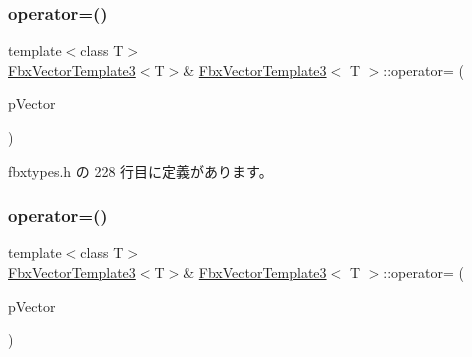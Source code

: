 \mbox{\label{class_fbx_vector_template3_a6776a6fce109a4e5eac1ef4efb56f070}} 
\subsubsection{\texorpdfstring{operator=()}{operator=()}\hspace{0.1cm}{\footnotesize\ttfamily [2/3]}}
{\footnotesize\ttfamily template$<$class T$>$ \\
\hyperlink{class_fbx_vector_template3}{Fbx\+Vector\+Template3}$<$T$>$\& \hyperlink{class_fbx_vector_template3}{Fbx\+Vector\+Template3}$<$ T $>$\+::operator= (\begin{DoxyParamCaption}\item[{const \hyperlink{class_fbx_vector_template2}{Fbx\+Vector\+Template2}$<$ T $>$ \&}]{p\+Vector }\end{DoxyParamCaption})\hspace{0.3cm}{\ttfamily [inline]}}



 fbxtypes.\+h の 228 行目に定義があります。

\mbox{\label{class_fbx_vector_template3_a19181aa6e706a12de98b417624e67e4d}} 
\subsubsection{\texorpdfstring{operator=()}{operator=()}\hspace{0.1cm}{\footnotesize\ttfamily [3/3]}}
{\footnotesize\ttfamily template$<$class T$>$ \\
\hyperlink{class_fbx_vector_template3}{Fbx\+Vector\+Template3}$<$T$>$\& \hyperlink{class_fbx_vector_template3}{Fbx\+Vector\+Template3}$<$ T $>$\+::operator= (\begin{DoxyParamCaption}\item[{const \hyperlink{class_fbx_vector_template3}{Fbx\+Vector\+Template3}$<$ T $>$ \&}]{p\+Vector }\end{DoxyParamCaption})\hspace{0.3cm}{\ttfamily [inline]}}



